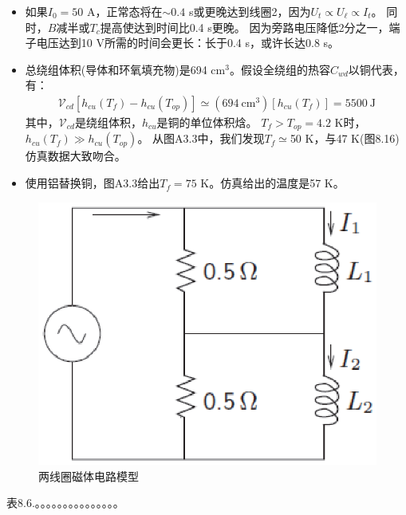 \begin{itemize}
\item 如果$I_0=50$ A，正常态将在$\sim 0.4$ s或更晚达到线圈2，因为$U_t\propto U_\ell\propto I_t$。
同时，$B$减半或$T_c$提高使达到时间比0.4 s更晚。
因为旁路电压降低2分之一，端子电压达到10 V所需的时间会更长：长于0.4 s，或许长达0.8 s。

\item 总绕组体积(导体和环氧填充物)是694 $\mathrm{cm^3}$。假设全绕组的热容$C_{wd}$以铜代表，有：
\begin{align*}%
\mathcal{V}_{cd}[h_{cu}(T_f)-h_{cu}(T_{op})]\simeq(694\ \mathrm{cm^3})[h_{cu}(T_f)]=5500\ \mathrm{J}
\end{align*}
其中，$\mathcal{V}_{cd}$是绕组体积，$h_{cu}$是铜的单位体积焓。
$T_f>T_{op}=4.2$ K时，$h_{cu}(T_f)\gg h_{cu}(T_{op})$。
从图A3.3中，我们发现$T_f\simeq$50 K，与47 K(图8.16)仿真数据大致吻合。

\item 使用铝替换铜，图A3.3给出$T_f=75$ K。仿真给出的温度是57 K。
\end{itemize}


\begin{figure}
	\centering
	\includegraphics[scale=0.6]{chpt8/figs/fig8.14.eps}
	\caption{两线圈磁体电路模型}
\end{figure}

表8.6.。。。。。。。。。。。。。。。

